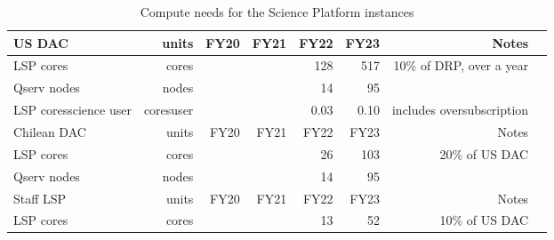 \tiny \begin{longtable} { |p{}  |r  |r  |r  |r  |r  |r  |r |} 
\caption{Compute needs for the Science Platform instances \label{tab:lspSizing}}\\ 
\hline 
\textbf{US DAC}&\textbf{units}&\textbf{FY20}&\textbf{FY21}&\textbf{FY22}&\textbf{FY23}&\textbf{Notes} \\ \hline
{LSP cores}&{cores}&{}&{}&{128}&{517}&{10\% of DRP, over a year} \\ \hline
{Qserv nodes}&{nodes}&{}&{}&{14}&{95}& \\ \hline
{LSP cores\/science user}&{cores\/user}&{}&{}&{0.03}&{0.10}&{includes oversubscription} \\ \hline
{Chilean DAC}&{units}&{FY20}&{FY21}&{FY22}&{FY23}&{Notes} \\ \hline
{LSP cores}&{cores}&{}&{}&{26}&{103}&{20\% of US DAC} \\ \hline
{Qserv nodes}&{nodes}&{}&{}&{14}&{95}& \\ \hline
{Staff LSP}&{units}&{FY20}&{FY21}&{FY22}&{FY23}&{Notes} \\ \hline
{LSP cores}&{cores}&{}&{}&{13}&{52}&{10\% of US DAC} \\ \hline
\end{longtable} \normalsize
